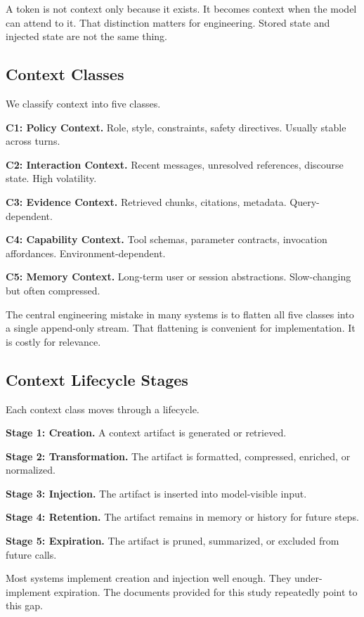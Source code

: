 \documentclass[conference]{IEEEtran}
\begin{document}
A token is not context only because it exists.
It becomes context when the model can attend to it.
That distinction matters for engineering.
Stored state and injected state are not the same thing.

\subsection{Context Classes}

We classify context into five classes.

\textbf{C1: Policy Context.}
Role, style, constraints, safety directives.
Usually stable across turns.

\textbf{C2: Interaction Context.}
Recent messages, unresolved references, discourse state.
High volatility.

\textbf{C3: Evidence Context.}
Retrieved chunks, citations, metadata.
Query-dependent.

\textbf{C4: Capability Context.}
Tool schemas, parameter contracts, invocation affordances.
Environment-dependent.

\textbf{C5: Memory Context.}
Long-term user or session abstractions.
Slow-changing but often compressed.

The central engineering mistake in many systems is to flatten all five classes into a single append-only stream.
That flattening is convenient for implementation.
It is costly for relevance.

\subsection{Context Lifecycle Stages}

Each context class moves through a lifecycle.

\textbf{Stage 1: Creation.}
A context artifact is generated or retrieved.

\textbf{Stage 2: Transformation.}
The artifact is formatted, compressed, enriched, or normalized.

\textbf{Stage 3: Injection.}
The artifact is inserted into model-visible input.

\textbf{Stage 4: Retention.}
The artifact remains in memory or history for future steps.

\textbf{Stage 5: Expiration.}
The artifact is pruned, summarized, or excluded from future calls.

Most systems implement creation and injection well enough.
They under-implement expiration.
The documents provided for this study repeatedly point to this gap.
\end{document}
